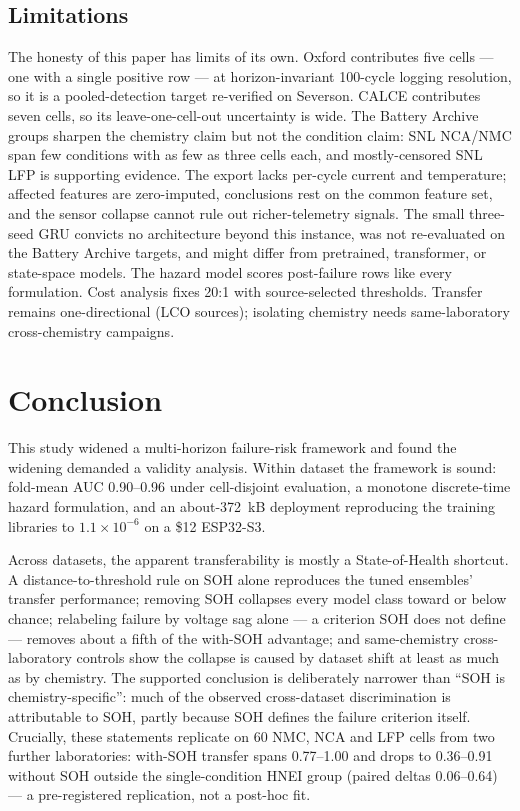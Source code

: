 \documentclass[preprint,12pt]{elsarticle}
\begin{document}
\subsection{Limitations}
The honesty of this paper has limits of its own. Oxford contributes five cells --- one with a single positive row --- at horizon-invariant 100-cycle logging resolution, so it is a pooled-detection target re-verified on Severson. CALCE contributes seven cells, so its leave-one-cell-out uncertainty is wide. The Battery Archive groups sharpen the chemistry claim but not the condition claim: SNL NCA/NMC span few conditions with as few as three cells each, and mostly-censored SNL LFP is supporting evidence. The export lacks per-cycle current and temperature; affected features are zero-imputed, conclusions rest on the common feature set, and the sensor collapse cannot rule out richer-telemetry signals. The small three-seed GRU convicts no architecture beyond this instance, was not re-evaluated on the Battery Archive targets, and might differ from pretrained, transformer, or state-space models. The hazard model scores post-failure rows like every formulation. Cost analysis fixes 20:1 with source-selected thresholds. Transfer remains one-directional (LCO sources); isolating chemistry needs same-laboratory cross-chemistry campaigns.

\section{Conclusion}
This study widened a multi-horizon failure-risk framework and found the widening demanded a validity analysis. Within dataset the framework is sound: fold-mean AUC 0.90--0.96 under cell-disjoint evaluation, a monotone discrete-time hazard formulation, and an about-372~kB deployment reproducing the training libraries to $1.1\times10^{-6}$ on a \$12 ESP32-S3.

Across datasets, the apparent transferability is mostly a State-of-Health shortcut. A distance-to-threshold rule on SOH alone reproduces the tuned ensembles' transfer performance; removing SOH collapses every model class toward or below chance; relabeling failure by voltage sag alone --- a criterion SOH does not define --- removes about a fifth of the with-SOH advantage; and same-chemistry cross-laboratory controls show the collapse is caused by dataset shift at least as much as by chemistry. The supported conclusion is deliberately narrower than ``SOH is chemistry-specific'': much of the observed cross-dataset discrimination is attributable to SOH, partly because SOH defines the failure criterion itself. Crucially, these statements replicate on 60 NMC, NCA and LFP cells from two further laboratories: with-SOH transfer spans 0.77--1.00 and drops to 0.36--0.91 without SOH outside the single-condition HNEI group (paired deltas 0.06--0.64) --- a pre-registered replication, not a post-hoc fit.
\end{document}
